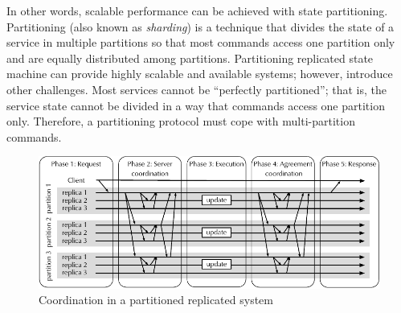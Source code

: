 In other words, scalable performance can be achieved with state partitioning.
Partitioning (also known as \emph{sharding}) is a technique that divides the
state of a service in multiple partitions so that most commands access one
partition only and are equally distributed among partitions. Partitioning
replicated state machine can provide highly scalable and available systems;
however, introduce other challenges. Most services cannot be ``perfectly
partitioned''; that is, the service state cannot be divided in a way that
commands access one partition only. Therefore, a partitioning protocol must cope
with multi-partition commands.

\begin{figure}
  \begin{minipage}[b]{1.0\linewidth}
  \centering
        \includegraphics[width=1\linewidth]{figures/replication-coordination}
  \end{minipage}
  \caption{Coordination in a partitioned replicated system}
  \label{fig:replication:coordination}
\end{figure}

